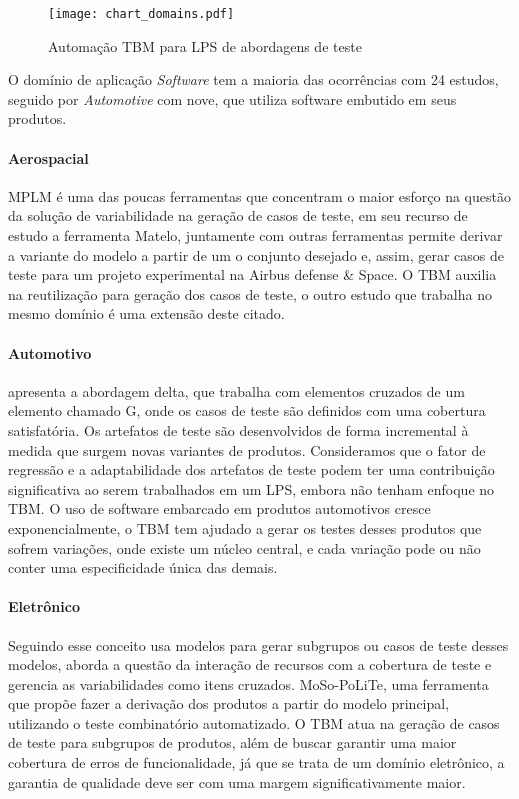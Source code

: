 \begin{figure}[!h]
	\centering	
	\texttt{[image: chart\_domains.pdf]}
	\caption{Automação TBM para LPS de abordagens de teste}
	\label{fig:chart_domains}
\end{figure}

O domínio de aplicação \textit{Software} tem a maioria das ocorrências com 24 estudos, seguido por \textit{Automotive} com nove, que utiliza software embutido em seus produtos.

\paragraph{\textbf{Aerospacial}}

MPLM é uma das poucas ferramentas que concentram o maior esforço na questão da solução de variabilidade na geração de casos de teste, \citet{samih2014mplm} em seu recurso de estudo a ferramenta Matelo, juntamente com outras ferramentas permite derivar a variante do modelo a partir de um o conjunto desejado e, assim, gerar casos de teste para um projeto experimental na Airbus defense \& Space. O TBM auxilia na reutilização para geração dos casos de teste, o outro estudo que trabalha no mesmo domínio é uma extensão deste citado.

\paragraph{\textbf{Automotivo}}

\citet{Lity_et_al2012} apresenta a abordagem delta, que trabalha com elementos cruzados de um elemento chamado G, onde os casos de teste são definidos com uma cobertura satisfatória. Os artefatos de teste são desenvolvidos de forma incremental à medida que surgem novas variantes de produtos. Consideramos que o fator de regressão e a adaptabilidade dos artefatos de teste podem ter uma contribuição significativa ao serem trabalhados em um LPS, embora não tenham enfoque no TBM. O uso de software embarcado em produtos automotivos cresce exponencialmente, o TBM tem ajudado a gerar os testes desses produtos que sofrem variações, onde existe um núcleo central, e cada variação pode ou não conter uma especificidade única das demais.

\paragraph{\textbf{Eletrônico}}

Seguindo esse conceito \citet{Steffens_et_al2012} usa modelos para gerar subgrupos ou casos de teste desses modelos, aborda a questão da interação de recursos com a cobertura de teste e gerencia as variabilidades como itens cruzados. MoSo-PoLiTe, uma ferramenta que propõe fazer a derivação dos produtos a partir do modelo principal, utilizando o teste combinatório automatizado. O TBM atua na geração de casos de teste para subgrupos de produtos, além de buscar garantir uma maior cobertura de erros de funcionalidade, já que se trata de um domínio eletrônico, a garantia de qualidade deve ser com uma margem significativamente maior.

